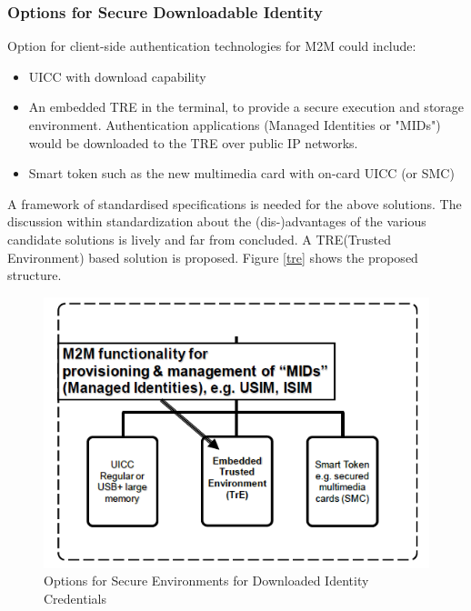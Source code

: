 \documentclass[12pt]{article}
\begin{document}
\subsubsection{Options for Secure Downloadable Identity} 
Option for client-side authentication technologies for M2M could include:
\begin{itemize}
\item UICC with download capability
\item An embedded TRE in the terminal, to provide a secure execution and storage
environment. Authentication applications (Managed Identities or "MIDs")
would be downloaded to the TRE over public IP networks.
\item Smart token such as the new multimedia card with on-card UICC (or SMC)

\end{itemize}

A framework of standardised specifications is needed for the above solutions. The discussion within standardization about the (dis-)advantages of the various candidate solutions is lively and far from concluded. A TRE(Trusted Environment) based solution is proposed. Figure \ref{tre} shows the proposed structure.

\begin{figure}[!t]
\centering
    \includegraphics[scale=0.8]{tre}
    \caption{Options for Secure Environments for Downloaded Identity Credentials}
    \label{tre}
\label{adhoc}

\end{figure}
\end{document}
